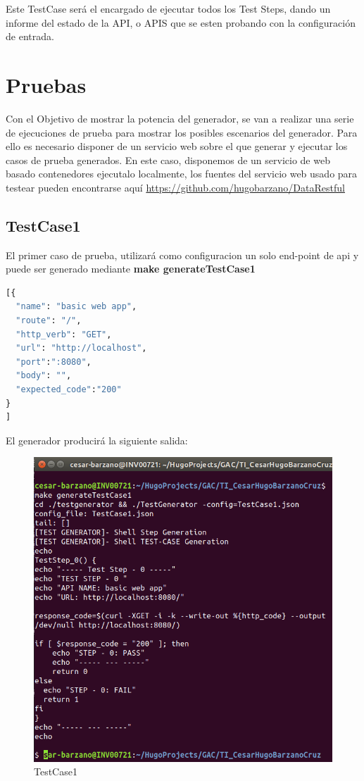 \documentclass[a4paper,11pt]{book}
\begin{document}
Este TestCase será el encargado de ejecutar todos los Test Steps, dando un informe del estado de la API, o APIS que se esten probando con la configuración de entrada.  
 
\section{Pruebas}

Con el Objetivo de mostrar la potencia del generador, se van a realizar una serie de ejecuciones de prueba para mostrar los posibles escenarios del generador. Para ello es necesario disponer de un servicio web sobre el que generar y ejecutar los casos de prueba generados.  En este caso, disponemos de un servicio de web basado contenedores ejecutalo localmente, los fuentes del servicio web usado para testear pueden encontrarse aquí
\href{DATARESTFUL}{https://github.com/hugobarzano/DataRestful}

\subsection*{TestCase1}

El primer caso de prueba, utilizará como configuracion un solo end-point de api y puede ser generado mediante \textbf{make generateTestCase1 }

 \begin{lstlisting}[language=python,caption={ TestCase1.json  }]
[{
  "name": "basic web app",
  "route": "/",
  "http_verb": "GET",
  "url": "http://localhost",
  "port":":8080",
  "body": "",
  "expected_code":"200"
}
]
\end{lstlisting}

El generador producirá la siguiente salida:
\begin{figure}[H]  
\centering 
\includegraphics[scale=0.35]{imagenes/TestCase1_1.png}
\caption{ TestCase1 }  
\end{figure} 
\end{document}
